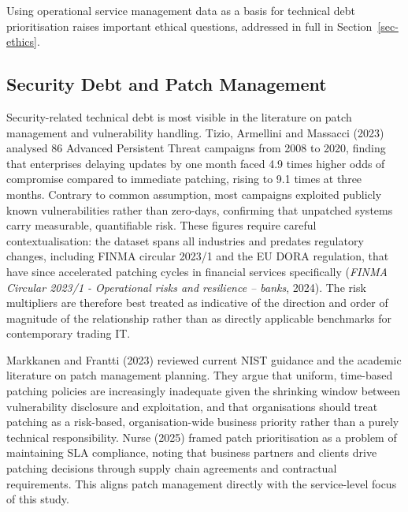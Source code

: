 \documentclass[
  12pt,
  letterpaper,
  12pt,
  oneside,
  english,
  onehalfspacing,
  headsepline]{MastersDoctoralThesis}
\begin{document}
Using operational service management data as a basis for technical debt
prioritisation raises important ethical questions, addressed in full in
Section~\ref{sec-ethics}.

\subsection{Security Debt and Patch
Management}\label{security-debt-and-patch-management}

Security-related technical debt is most visible in the literature on
patch management and vulnerability handling. Tizio, Armellini and
Massacci (2023) analysed 86 Advanced Persistent Threat campaigns from
2008 to 2020, finding that enterprises delaying updates by one month
faced 4.9 times higher odds of compromise compared to immediate
patching, rising to 9.1 times at three months. Contrary to common
assumption, most campaigns exploited publicly known vulnerabilities
rather than zero-days, confirming that unpatched systems carry
measurable, quantifiable risk. These figures require careful
contextualisation: the dataset spans all industries and predates
regulatory changes, including FINMA circular 2023/1 and the EU DORA
regulation, that have since accelerated patching cycles in financial
services specifically (\emph{{FINMA Circular} 2023/1 - {Operational}
risks and resilience -- banks}, 2024). The risk multipliers are
therefore best treated as indicative of the direction and order of
magnitude of the relationship rather than as directly applicable
benchmarks for contemporary trading IT.

Markkanen and Frantti (2023) reviewed current NIST guidance and the
academic literature on patch management planning. They argue that
uniform, time-based patching policies are increasingly inadequate given
the shrinking window between vulnerability disclosure and exploitation,
and that organisations should treat patching as a risk-based,
organisation-wide business priority rather than a purely technical
responsibility. Nurse (2025) framed patch prioritisation as a problem of
maintaining SLA compliance, noting that business partners and clients
drive patching decisions through supply chain agreements and contractual
requirements. This aligns patch management directly with the
service-level focus of this study.
\end{document}
